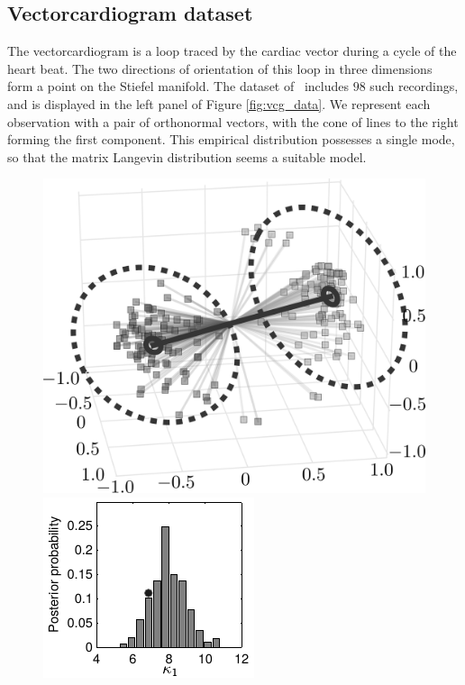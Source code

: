 
\subsection{Vectorcardiogram dataset}  \label{sec:vcg_np}

The vectorcardiogram is a loop traced by the {cardiac vector} during a cycle of the heart beat. The two directions of orientation of this
loop in three dimensions form a point on the Stiefel manifold. The dataset of~\cite{vecdata} includes $98$ such recordings,
and is displayed in the left panel of Figure \ref{fig:vcg_data}. We represent each observation with a pair of orthonormal vectors, with the cone of 
lines to the right forming
the first component. This empirical distribution 
possesses a single mode, so that
the matrix Langevin distribution seems a suitable model.
  \begin{figure}
  \centering
  \begin{minipage}{0.5\textwidth}
    \includegraphics{figs/plot_vcg_post_bw2.png}
  \end{minipage}
  \begin{minipage}{0.4\textwidth}
  \centering
    \includegraphics{figs/plot_vcg_kap1_bw.pdf}

\end{minipage}
\end{figure}
